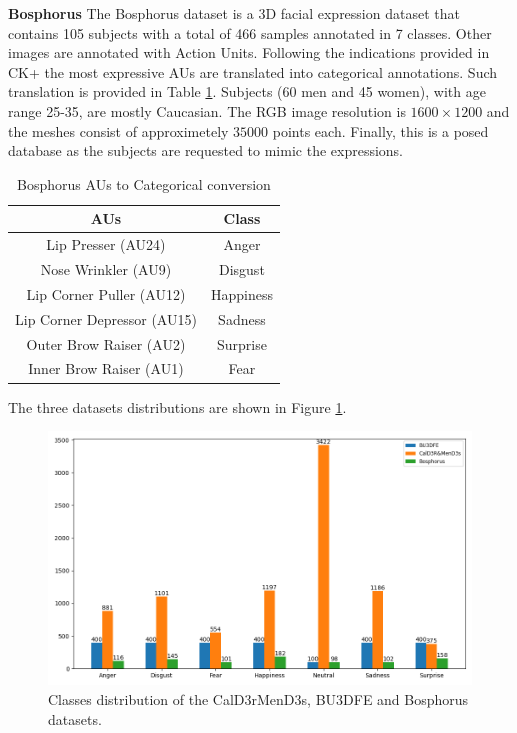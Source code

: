   \textbf{Bosphorus} \hspace{0.2cm} The Bosphorus dataset \cite{Bosphorus} is a 3D facial expression dataset that contains 105 subjects with a total of 466 samples annotated in 7 classes. Other images are annotated with Action Units. Following the indications provided in CK+ \cite{CK+} the most expressive AUs are translated into categorical annotations. Such translation is provided in Table \ref{AU_translation}. Subjects (60 men and 45 women), with age range 25-35, are mostly Caucasian. The RGB image resolution is $1600\times1200$ and the meshes consist of approximetely $35000$ points each. Finally, this is a posed database as the subjects are requested to mimic the expressions.\\


\begin{table}[H]
    \centering
    \caption{Bosphorus AUs to Categorical conversion}
    \begin{tabular}{cc}
    \hline
    AUs & Class\\
    \hline
    Lip Presser (AU24)  & Anger\\
    \hline
    Nose Wrinkler (AU9) & Disgust\\
    \hline
    Lip Corner Puller (AU12) & Happiness\\
    \hline
    Lip Corner Depressor (AU15) & Sadness\\
    \hline
    Outer Brow Raiser (AU2) & Surprise\\
    \hline
    Inner Brow Raiser (AU1) & Fear\\
    \hline
    \end{tabular}
    \label{AU_translation}
\end{table}


The three datasets distributions are shown in Figure \ref{dataset_distribution}.
\begin{figure}[ht]
\hspace{-0.6cm}
\includegraphics[width=1.2\columnwidth]{Images/Plot0.png}
\caption{Classes distribution of the CalD3rMenD3s, BU3DFE and Bosphorus datasets.}
\label{dataset_distribution}
\end{figure}

